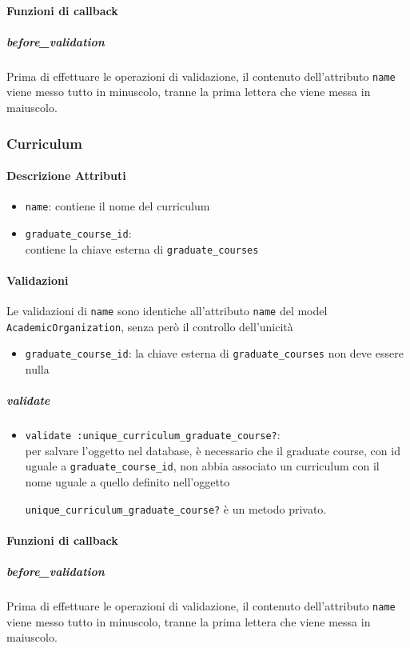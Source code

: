 \documentclass[11pt,a4paper]{article}
\begin{document}
\paragraph{Funzioni di callback}
\subparagraph{before\_validation}
Prima di effettuare le operazioni di validazione, il contenuto dell'attributo \verb|name| viene messo tutto in minuscolo, tranne la prima lettera che viene messa in maiuscolo.
\subsubsection{Curriculum}
\paragraph{Descrizione Attributi}
\begin{itemize}
 \item \verb|name|: contiene il nome del curriculum
 \item \verb|graduate_course_id|:\\ contiene la chiave esterna di \verb|graduate_courses|	 
\end{itemize}
\paragraph{Validazioni}
Le validazioni di \verb|name| sono identiche all'attributo \verb|name| del model \verb|AcademicOrganization|, senza però il controllo dell'unicità
\begin{itemize}
 \item \verb|graduate_course_id|: la chiave esterna di \verb|graduate_courses| non deve essere nulla
\end{itemize}
\subparagraph{validate}
\begin{itemize}
 \item \verb|validate :unique_curriculum_graduate_course?|: \\per salvare l'oggetto nel database, è necessario che il graduate course, con id uguale a \verb|graduate_course_id|, non abbia associato un curriculum con il nome uguale a quello definito nell'oggetto


\verb|unique_curriculum_graduate_course?| è un metodo privato.
\end{itemize}

\paragraph{Funzioni di callback}
\subparagraph{before\_validation}
Prima di effettuare le operazioni di validazione, il contenuto dell'attributo \verb|name| viene messo tutto in minuscolo, tranne la prima lettera che viene messa in maiuscolo.
\end{document}
